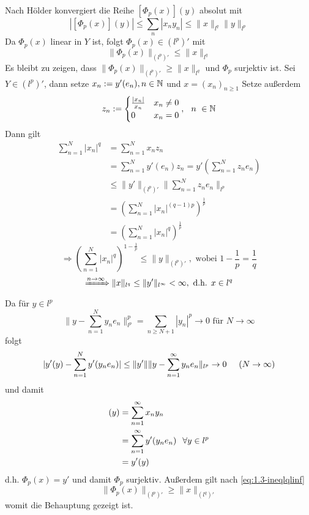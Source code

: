 \begin{beispiel}
	\begin{beweis}
		Nach Hölder konvergiert die Reihe $[\Phi_{p}(x)](y)$ absolut mit 
		\[ | [\Phi_{p}(x)](y) | \leq \sum_{n} |x_{n} y_{n}| \leq \| x \|_{l^{q}} \| y \|_{l^{p}} \]
		Da $\Phi_{p}(x)$ linear in $Y$ ist, folgt $\Phi_{p}(x) \in (l^{p})'$ mit
		\[ \| \Phi_{p}(x) \|_{(l^{p})'} \leq \| x \|_{l^{q}} \]
		Es bleibt zu zeigen, dass $ \| \Phi_{p}(x) \|_{(l^{p})'} \geq \| x \|_{l^{q}} $ und $\Phi_{p}$ surjektiv ist.
		Sei $Y \in (l^{p})'$, dann setze $x_{n} := y'(e_{n}), n \in \mathbb{N}$ und $x = (x_{n})_{n \geq 1}$
		Setze au{\ss}erdem
		\[ z_{n} := \begin{cases} \frac{|x_{n}|}{x_{n}} & x_{n} \neq 0 \\ 0 & x_{n} = 0 \end{cases}, \hspace{0.25cm} n \ \in \mathbb{N} \]
		Dann gilt
		\begin{align*}
			\sum_{n=1}^{N} |x_{n}|^{q} & = \sum_{n = 1}^{N} x_{n} z_{n} \\
			& = \sum_{n = 1}^{N} y'(e_{n}) z_{n} = y'\left(\sum_{n = 1}^{N} z_{n} e_{n} \right) \\
			& \leq \| y' \|_{(l^{p})'} \| \sum_{n = 1}^{N} z_{n} e_{n} \|_{l^{p}} \\
			& = \left( \sum_{n = 1}^{N} |x_{n}|^{(q - 1)p} \right)^{\frac{1}{p}} \\
			& = \left( \sum_{n = 1}^{N} |x_{n}|^{q}\right)^{\frac{1}{p}}
		\end{align*}
		\[ \Rightarrow \left( \sum_{n = 1}^{N} |x_{n}|^{q} \right)^{1-\frac{1}{p}} \leq \| y \|_{(l^{p})'}, \text{ wobei } 1 - \frac{1}{p} = \frac{1}{q} \]
		\[ \xRightarrow{n \rightarrow \infty} \| x \|_{l^{q}} \leq \| y' \|_{l^{\infty}} < \infty, \text{ d.h. } x \in
		l^{q} \label{eq:1.3-ineqlqlinf} \]
		Da für $y \in l^{p}$
		\[ \| y - \sum_{n = 1}^{N} y_{n} e_{n} \|_{l^{p}}^{p} = \sum_{n \geq N + 1} |y_{n}|^{p} \rightarrow 0 \text{ für } N \rightarrow \infty \]
		folgt
		\[ | y' (y) - \sum_{n = 1}^{N} y' ( y_{n} e_{n} ) | \leq \| y' \| \| y - \sum_{n = 1}^{\infty} y_{n} e_{n} \|_{l^{p}}  \rightarrow 0 \hspace{0.5cm} (N \rightarrow \infty) \]
		und damit \\
		\begin{align*}
			[ \Phi_{p} (x) ](y) & = \sum_{n = 1}^{\infty} x_{n} y_{n} \\
			& = \sum_{n = 1}^{\infty} y'(y_{n} e_{n}) \hspace{0.25cm} \forall y \in l^{p} \\
			& = y'(y)			
		\end{align*}
		d.h. $ \Phi_{p}(x) = y'$ und damit $\Phi_{p}$ surjektiv.
		Außerdem gilt nach \eqref{eq:1.3-ineqlqlinf}
		\[ \| \Phi_{p}(x) \|_{(l^{p})'} \geq \| x \|_{(l^{q})'} \]
		womit die Behauptung gezeigt ist.
	\end{beweis}
\end{beispiel}

